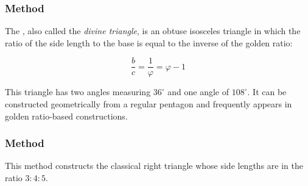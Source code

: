 
\subsubsection{Method } %
\label{ssub:method_line_golden__gnomon}

The , also called the \emph{divine triangle}, is an obtuse isosceles triangle in which the ratio of the side length to the base is equal to the inverse of the golden ratio:

\[
\dfrac{b}{c} = \frac{1}{\varphi} = \varphi - 1
\]

\noindent
This triangle has two angles measuring $36^\circ$ and one angle of $108^\circ$. It can be constructed geometrically from a regular pentagon and frequently appears in golden ratio-based constructions.

\vspace{1em}

\begin{minipage}{.5\textwidth}
\begin{center}
\end{center}
\end{minipage}
\begin{minipage}{.5\textwidth}
\begin{tkzexample}
\end{tkzexample}
\end{minipage}

\subsubsection{Method } %
\label{ssub:_line_egyptian}

This method constructs the classical right triangle whose side lengths are in the ratio $3\mathbin{:}4\mathbin{:}5$.

